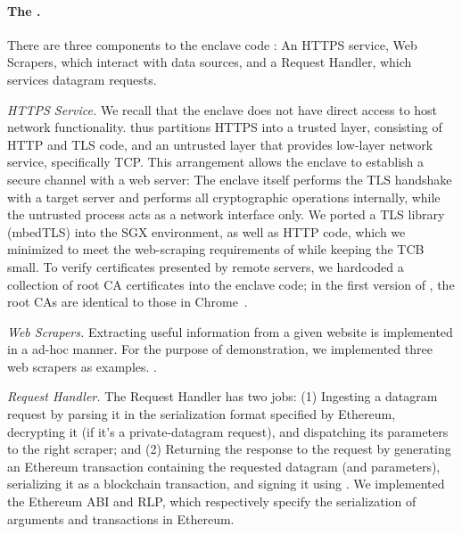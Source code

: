 \paragraph{\bf The \encname.} There are three components to the enclave code
\engine: An HTTPS service, Web Scrapers, which interact with data sources, and a
Request Handler, which services datagram requests. 

\vspace{2mm}

\noindent\emph{HTTPS Service.} We recall that the enclave does not have direct
access to host network functionality. \tc thus partitions HTTPS into a trusted
layer, consisting of HTTP and TLS code, and an untrusted layer that provides
low-layer network service, specifically TCP.  This arrangement allows the
enclave to establish a secure channel with a web server: The enclave itself
performs the TLS handshake with a target server and performs all cryptographic
operations internally, while the untrusted process acts as a network interface
only. We ported a TLS library (mbedTLS) into the SGX environment, as well as
HTTP code, which we minimized to meet the web-scraping requirements of \tc while
keeping the TCB small. To verify certificates presented by remote servers, we
hardcoded a collection of root CA certificates into the enclave code; in the
first version of \tc, the root CAs are identical to those in Chrome~\cite{}.

\vspace{2mm}

\noindent\emph{Web Scrapers.} Extracting useful information from a given website
is implemented in a ad-hoc manner. For the purpose of demonstration, we
implemented three web scrapers as examples. .

\vspace{2mm}

\noindent\emph{Request Handler.} The Request Handler has two jobs: (1) Ingesting
a datagram request by parsing it in the serialization format specified by
Ethereum, decrypting it (if it's a private-datagram request), and dispatching
its parameters to the right scraper; and (2) Returning the response to the
request by generating an Ethereum transaction containing the requested datagram
(and parameters), serializing it as a blockchain transaction, and signing it
using \skTC. We implemented the Ethereum ABI and RLP, which respectively specify
the serialization of arguments and transactions in Ethereum. 

\vspace{2mm}

